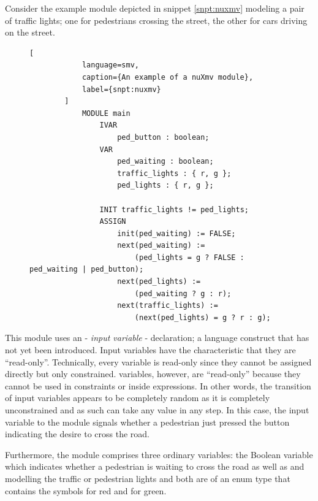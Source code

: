 \begin{example}
\label{exm:traffic-lights}
    Consider the example module depicted in snippet \ref{snpt:nuxmv} modeling a pair of traffic lights; one for pedestrians crossing the street, the other for cars driving on the street.

    \begin{figure}
        \begin{lstlisting}[
            language=smv,
            caption={An example of a nuXmv module},
            label={snpt:nuxmv}
        ]
            MODULE main
                IVAR
                    ped_button : boolean;
                VAR
                    ped_waiting : boolean;
                    traffic_lights : { r, g };
                    ped_lights : { r, g };

                INIT traffic_lights != ped_lights;
                ASSIGN
                    init(ped_waiting) := FALSE;
                    next(ped_waiting) :=
                        (ped_lights = g ? FALSE : ped_waiting | ped_button);
                    next(ped_lights) :=
                        (ped_waiting ? g : r);
                    next(traffic_lights) :=
                        (next(ped_lights) = g ? r : g);
        \end{lstlisting}
    \end{figure}

    This module uses an  - \textit{input variable} - declaration; a language construct that has not yet been introduced.
    Input variables have the characteristic that they are \enquote{read-only}.
    Technically, every variable is read-only since they cannot be assigned directly but only constrained.
     variables, however, are \enquote{read-only} because they cannot be used in  constraints or inside  expressions.
    In other words, the transition of input variables appears to be completely random as it is completely unconstrained and as such can take any value in any step.
    In this case, the input variable to the module signals whether a pedestrian just pressed the button indicating the desire to cross the road.

    Furthermore, the module comprises three ordinary variables: the Boolean variable  which indicates whether a pedestrian is waiting to cross the road as well as  and  modelling the traffic or pedestrian lights and both are of an enum type that contains the symbols  for red and  for green.


\end{example}
